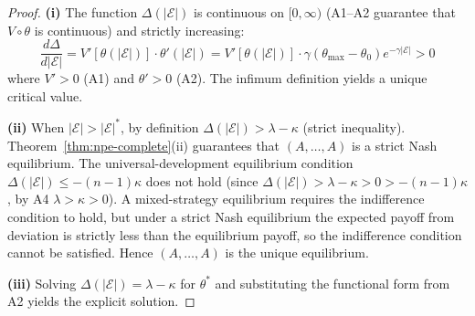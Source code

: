 \documentclass[12pt,a4paper]{article}
\theoremstyle{definition}
\theoremstyle{remark}
\begin{document}
\begin{proof}
\textbf{(i)} The function $\Delta(|\mathcal{E}|)$ is continuous on $[0, \infty)$ (A1--A2 guarantee that $V \circ \theta$ is continuous) and strictly increasing:
\begin{equation}
\frac{d\Delta}{d|\mathcal{E}|} = V'[\theta(|\mathcal{E}|)] \cdot \theta'(|\mathcal{E}|) = V'[\theta(|\mathcal{E}|)] \cdot \gamma(\theta_{\max} - \theta_0) e^{-\gamma |\mathcal{E}|} > 0
\end{equation}
where $V' > 0$ (A1) and $\theta' > 0$ (A2). The infimum definition yields a unique critical value.

\textbf{(ii)} When $|\mathcal{E}| > |\mathcal{E}|^*$, by definition $\Delta(|\mathcal{E}|) > \lambda - \kappa$ (strict inequality). Theorem~\ref{thm:npe-complete}(ii) guarantees that $(A, \ldots, A)$ is a strict Nash equilibrium. The universal-development equilibrium condition $\Delta(|\mathcal{E}|) \leq -(n-1)\kappa$ does not hold (since $\Delta(|\mathcal{E}|) > \lambda - \kappa > 0 > -(n-1)\kappa$, by A4 $\lambda > \kappa > 0$). A mixed-strategy equilibrium requires the indifference condition to hold, but under a strict Nash equilibrium the expected payoff from deviation is strictly less than the equilibrium payoff, so the indifference condition cannot be satisfied. Hence $(A, \ldots, A)$ is the unique equilibrium.

\textbf{(iii)} Solving $\Delta(|\mathcal{E}|) = \lambda - \kappa$ for $\theta^*$ and substituting the functional form from A2 yields the explicit solution.
\end{proof}
\end{document}
